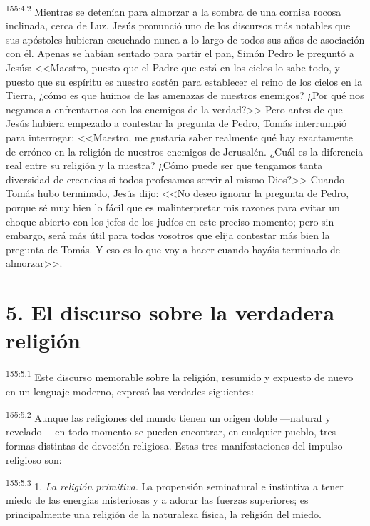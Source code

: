 \par 
\textsuperscript{155:4.2} Mientras se detenían para almorzar a la sombra de una cornisa rocosa inclinada, cerca de Luz, Jesús pronunció uno de los discursos más notables que sus apóstoles hubieran escuchado nunca a lo largo de todos sus años de asociación con él. Apenas se habían sentado para partir el pan, Simón Pedro le preguntó a Jesús: <<Maestro, puesto que el Padre que está en los cielos lo sabe todo, y puesto que su espíritu es nuestro sostén para establecer el reino de los cielos en la Tierra, ¿cómo es que huimos de las amenazas de nuestros enemigos? ¿Por qué nos negamos a enfrentarnos con los enemigos de la verdad?>> Pero antes de que Jesús hubiera empezado a contestar la pregunta de Pedro, Tomás interrumpió para interrogar: <<Maestro, me gustaría saber realmente qué hay exactamente de erróneo en la religión de nuestros enemigos de Jerusalén. ¿Cuál es la diferencia real entre su religión y la nuestra? ¿Cómo puede ser que tengamos tanta diversidad de creencias si todos profesamos servir al mismo Dios?>> Cuando Tomás hubo terminado, Jesús dijo: <<No deseo ignorar la pregunta de Pedro, porque sé muy bien lo fácil que es malinterpretar mis razones para evitar un choque abierto con los jefes de los judíos en este preciso momento; pero sin embargo, será más útil para todos vosotros que elija contestar más bien la pregunta de Tomás. Y eso es lo que voy a hacer cuando hayáis terminado de almorzar>>.

\section*{5. El discurso sobre la verdadera religión}
\par 
\textsuperscript{155:5.1} Este discurso memorable sobre la religión, resumido y expuesto de nuevo en un lenguaje moderno, expresó las verdades siguientes:

\par 
\textsuperscript{155:5.2} Aunque las religiones del mundo tienen un origen doble ---natural y revelado--- en todo momento se pueden encontrar, en cualquier pueblo, tres formas distintas de devoción religiosa. Estas tres manifestaciones del impulso religioso son:

\par 
\textsuperscript{155:5.3} 1. \textit{La religión primitiva}. La propensión seminatural e instintiva a tener miedo de las energías misteriosas y a adorar las fuerzas superiores; es principalmente una religión de la naturaleza física, la religión del miedo.

